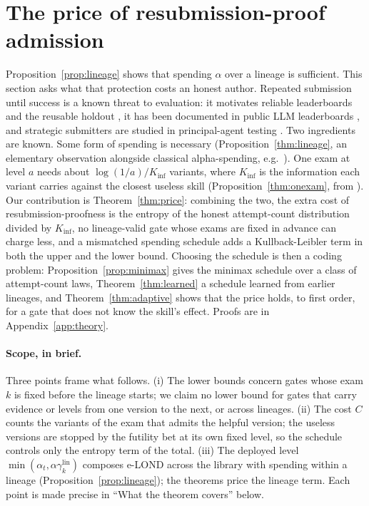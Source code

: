 \section{The price of resubmission-proof admission}\label{sec:theory}
Proposition~\ref{prop:lineage} shows that spending $\alpha$ over a lineage is sufficient. This section asks what that protection costs an honest author. Repeated submission until success is a known threat to evaluation: it motivates reliable leaderboards and the reusable holdout \citep{blum2015ladder,dwork2015reusable}, it has been documented in public LLM leaderboards \citep{singh2025leaderboard}, and strategic submitters are studied in principal-agent testing \citep{bates2022principal}. Two ingredients are known. Some form of spending is necessary (Proposition~\ref{thm:lineage}, an elementary observation alongside classical alpha-spending, e.g.\ \citealp{tian2021online}). One exam at level $a$ needs about $\log(1/a)/K_{\inf}$ variants, where $K_{\inf}$ is the information each variant carries against the closest useless skill (Proposition~\ref{thm:onexam}, from \citealp{agrawal2025stopping,honda2010asymptotically,larsson2025numeraire}). Our contribution is Theorem~\ref{thm:price}: combining the two, the extra cost of resubmission-proofness is the entropy of the honest attempt-count distribution divided by $K_{\inf}$, no lineage-valid gate whose exams are fixed in advance can charge less, and a mismatched spending schedule adds a Kullback-Leibler term in both the upper and the lower bound. Choosing the schedule is then a coding problem: Proposition~\ref{prop:minimax} gives the minimax schedule over a class of attempt-count laws, Theorem~\ref{thm:learned} a schedule learned from earlier lineages, and Theorem~\ref{thm:adaptive} shows that the price holds, to first order, for a gate that does not know the skill's effect. Proofs are in Appendix~\ref{app:theory}.

\paragraph{Scope, in brief.} Three points frame what follows. (i) The lower bounds concern gates whose exam $k$ is fixed before the lineage starts; we claim no lower bound for gates that carry evidence or levels from one version to the next, or across lineages. (ii) The cost $C$ counts the variants of the exam that admits the helpful version; the useless versions are stopped by the futility bet at its own fixed level, so the schedule controls only the entropy term of the total. (iii) The deployed level $\min(\alpha_t,\alpha\gamma^{\text{lin}}_k)$ composes e-LOND across the library with spending within a lineage (Proposition~\ref{prop:lineage}); the theorems price the lineage term. Each point is made precise in ``What the theorem covers'' below.

